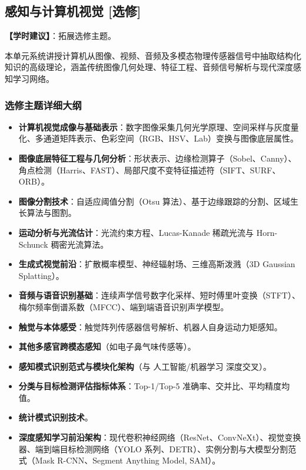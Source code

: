\subsection{感知与计算机视觉 [选修]}
\textbf{【学时建议】}：拓展选修主题。

本单元系统讲授计算机从图像、视频、音频及多模态物理传感器信号中抽取结构化知识的高级理论，涵盖传统图像几何处理、特征工程、音频信号解析与现代深度感知学习网络。

\subsubsection{选修主题详细大纲}
\begin{itemize}
    \item \textbf{计算机视觉成像与基础表示}：数字图像采集几何光学原理、空间采样与灰度量化、多通道矩阵表示、色彩空间（RGB、HSV、Lab）变换与图像底层属性。
    \item \textbf{图像底层特征工程与几何分析}：形状表示、边缘检测算子（Sobel、Canny）、角点检测（Harris、FAST）、局部尺度不变特征描述符（SIFT、SURF、ORB）。
    \item \textbf{图像分割技术}：自适应阈值分割（Otsu 算法）、基于边缘跟踪的分割、区域生长算法与图割。
    \item \textbf{运动分析与光流估计}：光流约束方程、Lucas-Kanade 稀疏光流与 Horn-Schunck 稠密光流算法。
    \item \textbf{生成式视觉前沿}：扩散概率模型、神经辐射场、三维高斯泼溅（3D Gaussian Splatting）。
    \item \textbf{音频与语音识别基础}：连续声学信号数字化采样、短时傅里叶变换（STFT）、梅尔频率倒谱系数（MFCC）、端到端语音识别声学模型。
    \item \textbf{触觉与本体感受}：触觉阵列传感器信号解析、机器人自身运动力矩感知。
    \item \textbf{其他多感官跨模态感知}（如电子鼻气味传感等）。
    \item \textbf{感知模式识别范式与模块化架构}（与 人工智能/机器学习 深度交叉）。
    \item \textbf{分类与目标检测评估指标体系}：Top-1/Top-5 准确率、交并比、平均精度均值。
    \item \textbf{统计模式识别技术}。
    \item \textbf{深度感知学习前沿架构}：现代卷积神经网络（ResNet、ConvNeXt）、视觉变换器、端到端目标检测网络（YOLO 系列、DETR）、实例分割与大模型分割范式（Mask R-CNN、Segment Anything Model, SAM）。
\end{itemize}

